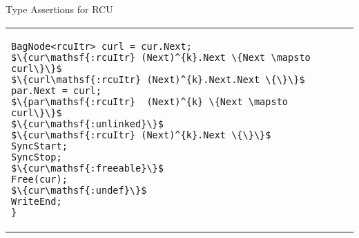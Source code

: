 \documentclass[aspectratio=169,xcolor=dvipsnames]{beamer}
\newcommand{\assert}[1]{\{#1\}}
\begin{document}
\begin{frame}{Type Assertions for RCU}
\begin{figure*}[t!]
\begin{tabular}{p{}p{}}
\begin{lstlisting}[basicstyle=\scriptsize\ttfamily]
BagNode<rcuItr> curl = cur.Next;
$\assert{cur\mathsf{:rcuItr} (Next)^{k}.Next \{Next \mapsto curl\}}$
$\assert{curl\mathsf{:rcuItr} (Next)^{k}.Next.Next \{\}}$
par.Next = curl;
$\assert{par\mathsf{:rcuItr}  (Next)^{k} \{Next \mapsto curl\}}$
$\assert{cur\mathsf{:unlinked}}$
$\assert{cur\mathsf{:rcuItr} (Next)^{k}.Next \{\}}$
SyncStart;
SyncStop;
$\assert{cur\mathsf{:freeable}}$
Free(cur);
$\assert{cur\mathsf{:undef}}$
WriteEnd;
}
\end{lstlisting}
\end{tabular}
\vspace{-2em}
\caption{RCU client: singly linked list based bag implementation.}
\label{fig:rculist}
\end{figure*}
\end{frame}
\end{document}
